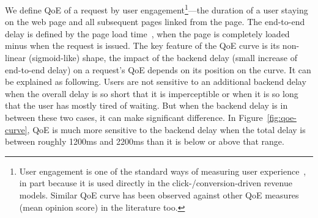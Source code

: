 We define QoE of a request by user engagement\footnote{User engagement is one of the standard ways of measuring user experience~\cite{balachandran2014modeling,shafiq2014understanding,dobrian2011understanding}, in part because it is used directly in the click-/conversion-driven revenue models. Similar QoE curve has been observed against other QoE measures (\eg mean opinion score) in the literature too.}---the duration of a user staying on the web page and all subsequent pages linked from the page. 
The end-to-end delay is defined by the page load time~\cite{wang2013demystify}, \ie when the page is completely loaded minus when the request is issued.
The key feature of the QoE curve is its non-linear (sigmoid-like) shape, \ie the impact of the backend delay (\ie small increase of end-to-end delay) on a request's QoE depends on its position on the curve.
It can be explained as following.
Users are not sensitive to an additional backend delay when the overall delay is so short that it is imperceptible or when it is so long that the user has mostly tired of waiting. But when the backend delay is in between these two cases, it can make significant difference. 
In Figure~\ref{fig:qoe-curve}, QoE is much more sensitive to the backend delay when the total delay is between roughly 1200ms and 2200ms than it is below or above that range.



